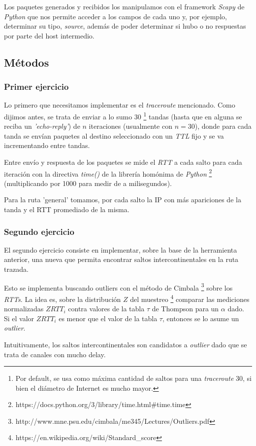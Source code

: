 Los paquetes generados y recibidos los manipulamos con el framework \emph{Scapy} de \emph{Python} que nos permite acceder a los campos de cada uno y, por ejemplo, determinar su tipo, \emph{source}, además de poder determinar si hubo o no respuestas por parte del host intermedio.

\subsection{Métodos}
\subsubsection{Primer ejercicio}

Lo primero que necesitamos implementar es el \emph{traceroute} mencionado. Como dijimos antes, se trata de enviar a lo sumo 30 \footnote{Por default, se usa como máxima cantidad de saltos para una \emph{traceroute} 30, si bien el diámetro de Internet es mucho mayor.} tandas (hasta que en alguna se reciba un \emph{'echo-reply'}) de $n$ iteraciones (usualmente con $n = 30$), donde para cada tanda se envían paquetes al destino seleccionado con un \emph{TTL} fijo y se va incrementando entre tandas.

Entre envío y respuesta de los paquetes se mide el \emph{RTT} a cada salto para cada iteración con la directiva \emph{time()} de la librería homónima de \emph{Python} \footnote{https://docs.python.org/3/library/time.html\#time.time} (multiplicando por 1000 para medir de a milisegundos).

Para la ruta 'general' tomamos, por cada salto la IP con más apariciones de la tanda y el RTT promediado de la misma.

\subsubsection{Segundo ejercicio}

El segundo ejercicio consiste en implementar, sobre la base de la herramienta anterior, una nueva que permita encontrar saltos intercontinentales en la ruta trazada.

Esto se implementa buscando outliers con el método de Cimbala \footnote{http://www.mne.psu.edu/cimbala/me345/Lectures/Outliers.pdf} sobre los \emph{RTTs}. La idea es, sobre la distribución $Z$ del muestreo \footnote {https://en.wikipedia.org/wiki/Standard_score} comparar las mediciones normalizadas $ZRTT_i$ contra valores de la tabla $\tau$ de Thompson para un $\alpha$ dado. Si el valor $ZRTT_i$ es menor que el valor de la tabla $\tau$, entonces se lo asume un \emph{outlier}.

Intuitivamente, los saltos intercontinentales son candidatos a \emph{outlier} dado que se trata de canales con mucho delay.
